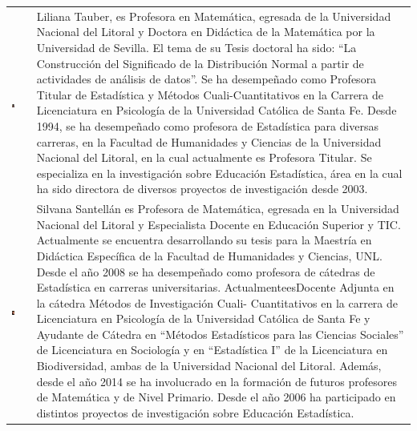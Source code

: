 \begin{table}[H]
\centering
\begin{tabular}{m{}  m{}}
\begin{center} \includegraphics[width=0.2\textwidth]{./fotos/tauber} \end{center} & 
\noindent \small{Liliana Tauber, es Profesora en Matemática, egresada de la Universidad Nacional del Litoral y Doctora en Didáctica de la Matemática por la Universidad de Sevilla. El tema de su Tesis doctoral ha sido: “La Construcción del Significado de la Distribución Normal a partir de actividades de análisis de datos”. Se ha desempeñado como Profesora Titular de Estadística y Métodos Cuali-Cuantitativos en la Carrera de Licenciatura en Psicología de la Universidad Católica de Santa Fe. Desde 1994, se ha desempeñado como profesora de Estadística para diversas carreras, en la Facultad de Humanidades y Ciencias de la Universidad Nacional del Litoral, en la cual actualmente es Profesora Titular. Se especializa en la investigación sobre Educación Estadística, área en la cual ha sido directora de diversos proyectos de investigación desde 2003.} \\
\begin{center} \includegraphics[width=0.2\textwidth]{./fotos/santellan} \end{center} & 
\noindent \small{Silvana Santellán es Profesora de Matemática, egresada en la Universidad Nacional del Litoral y Especialista Docente en Educación Superior y TIC. Actualmente se encuentra desarrollando su tesis para la Maestría en Didáctica Específica de la Facultad de Humanidades y Ciencias, UNL. Desde el año 2008 se ha desempeñado como profesora de cátedras de Estadística en carreras universitarias. ActualmenteesDocente Adjunta en
la cátedra Métodos de Investigación Cuali- Cuantitativos en la carrera de Licenciatura en Psicología de la Universidad Católica de Santa Fe y Ayudante de Cátedra en “Métodos Estadísticos para las Ciencias Sociales”
de Licenciatura en Sociología y en “Estadística I” de la Licenciatura en Biodiversidad, ambas de la Universidad Nacional del Litoral. Además, desde el año 2014 se ha involucrado en la formación de futuros profesores de Matemática y de Nivel Primario. Desde el año 2006 ha participado en distintos proyectos de investigación sobre Educación Estadística.} \\
\end{tabular}
\end{table}

